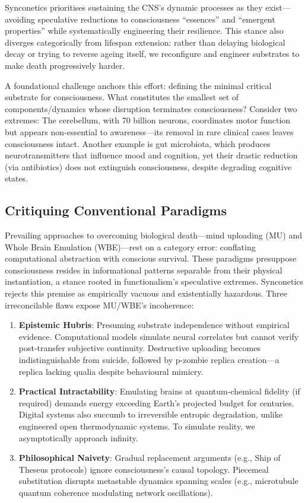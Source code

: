 \documentclass[10pt]{article}
\begin{document}
\begin{sloppypar}
  Synconetics prioritises sustaining the CNS’s dynamic processes as they exist—avoiding speculative reductions to consciousness “essences” and “emergent properties” while systematically engineering their resilience. This stance also diverges categorically from lifespan extension: rather than delaying biological decay or trying to reverse ageing itself, we reconfigure and engineer substrates to make death progressively harder.

  A foundational challenge anchors this effort: defining the minimal critical substrate for consciousness. What constitutes the smallest set of components/dynamics whose disruption terminates consciousness? Consider two extremes: The cerebellum, with 70 billion neurons, coordinates motor function but appears non-essential to awareness—its removal in rare clinical cases leaves consciousness intact. Another example is gut microbiota, which produces neurotransmitters that influence mood and cognition, yet their drastic reduction (via antibiotics) does not extinguish consciousness, despite degrading cognitive states.

  \subsection{Critiquing Conventional Paradigms}
  \label{sec:new-paradigm}

  Prevailing approaches to overcoming biological death—mind uploading (MU) and Whole Brain Emulation (WBE)—rest on a category error: conflating computational abstraction with conscious survival. These paradigms presuppose consciousness resides in informational patterns separable from their physical instantiation, a stance rooted in functionalism’s speculative extremes. Synconetics rejects this premise as empirically vacuous and existentially hazardous. Three irreconcilable flaws expose MU/WBE’s incoherence:

  \begin{enumerate}
    \item \textbf{Epistemic Hubris}: Presuming substrate independence without empirical evidence. Computational models simulate neural correlates but cannot verify post-transfer subjective continuity. Destructive uploading becomes indistinguishable from suicide, followed by p-zombie replica creation—a replica lacking qualia despite behavioural mimicry.
    \item \textbf{Practical Intractability}: Emulating brains at quantum-chemical fidelity (if required) demands energy exceeding Earth’s projected budget for centuries. Digital systems also succumb to irreversible entropic degradation, unlike engineered open thermodynamic systems. To simulate reality, we asymptotically approach infinity.
    \item \textbf{Philosophical Naivety}: Gradual replacement arguments (e.g., Ship of Theseus protocols) ignore consciousness’s causal topology. Piecemeal substitution disrupts metastable dynamics spanning scales (e.g., microtubule quantum coherence modulating network oscillations).
  \end{enumerate}


\end{sloppypar}
\end{document}
